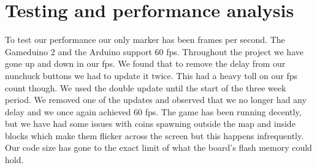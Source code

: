 \chapter{Testing and performance analysis}

To test our performance our only marker has been frames per second. The Gameduino 2 and the Arduino support 60 fps. Throughout the project we have gone up and down in our fps. We found that to remove the delay from our nunchuck buttons we had to update it twice. This had a heavy toll on our fps count though. We used the double update until the start of the three week period. We removed one of the updates and observed that we no longer had any delay and we once again achieved 60 fps. The game has been running decently, but we have had some issues with coins spawning outside the map and inside blocks which make them flicker across the screen but this happens infrequently. Our code size has gone to the exact limit of what the board's flash memory could hold.